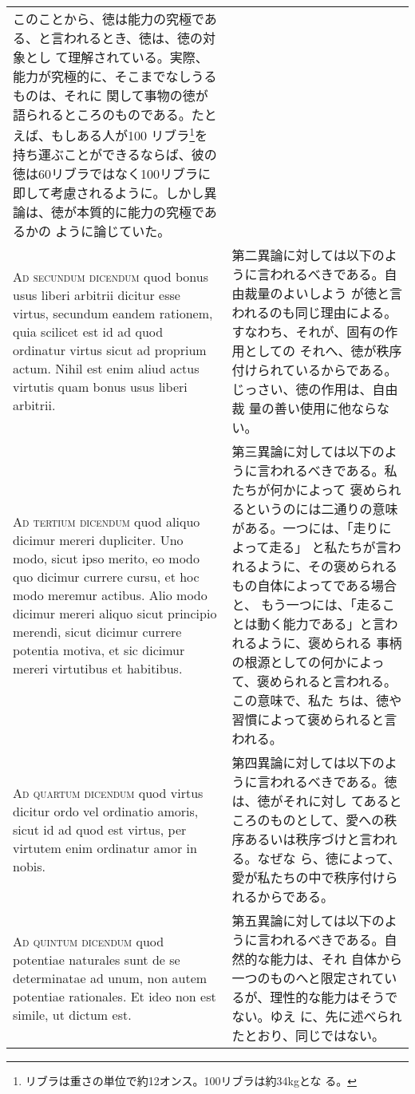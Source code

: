 \documentclass[10pt]{jsarticle}
\begin{document}
\begin{longtable}{p{21em}p{21em}}
このことから、徳は能力の究極である、と言われるとき、徳は、徳の対象とし
て理解されている。実際、能力が究極的に、そこまでなしうるものは、それに
関して事物の徳が語られるところのものである。たとえば、もしある人が100
リブラ\footnote{リブラは重さの単位で約12オンス。100リブラは約34kgとな
る。}を持ち運ぶことができるならば、彼の徳は60リブラではなく100リブラに
即して考慮されるように。しかし異論は、徳が本質的に能力の究極であるかの
ように論じていた。


\\

{\scshape Ad secundum dicendum} quod bonus usus liberi arbitrii
dicitur esse virtus, secundum eandem rationem, quia scilicet est id ad
quod ordinatur virtus sicut ad proprium actum. Nihil est enim aliud
actus virtutis quam bonus usus liberi arbitrii.

&

第二異論に対しては以下のように言われるべきである。自由裁量のよいしよう
が徳と言われるのも同じ理由による。すなわち、それが、固有の作用としての
それへ、徳が秩序付けられているからである。じっさい、徳の作用は、自由裁
量の善い使用に他ならない。

\\

{\scshape Ad tertium dicendum} quod aliquo dicimur mereri
dupliciter. Uno modo, sicut ipso merito, eo modo quo dicimur currere
cursu, et hoc modo meremur actibus. Alio modo dicimur mereri aliquo
sicut principio merendi, sicut dicimur currere potentia motiva, et sic
dicimur mereri virtutibus et habitibus.

&

第三異論に対しては以下のように言われるべきである。私たちが何かによって
褒められるというのには二通りの意味がある。一つには、「走りによって走る」
と私たちが言われるように、その褒められるもの自体によってである場合と、
もう一つには、「走ることは動く能力である」と言われるように、褒められる
事柄の根源としての何かによって、褒められると言われる。この意味で、私た
ちは、徳や習慣によって褒められると言われる。

\\



{\scshape Ad quartum dicendum} quod virtus dicitur ordo vel ordinatio
amoris, sicut id ad quod est virtus, per virtutem enim ordinatur amor
in nobis.

&

第四異論に対しては以下のように言われるべきである。徳は、徳がそれに対し
てあるところのものとして、愛への秩序あるいは秩序づけと言われる。なぜな
ら、徳によって、愛が私たちの中で秩序付けられるからである。


\\



{\scshape Ad quintum dicendum} quod potentiae naturales sunt de se
determinatae ad unum, non autem potentiae rationales. Et ideo non est
simile, ut dictum est.

&

第五異論に対しては以下のように言われるべきである。自然的な能力は、それ
自体から一つのものへと限定されているが、理性的な能力はそうでない。ゆえ
に、先に述べられたとおり、同じではない。

\end{longtable}
\end{document}
